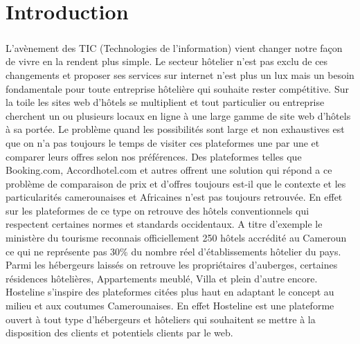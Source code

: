 \chapter*{Introduction}

\paragraph{}
L’avènement des TIC (Technologies de l’information) vient changer notre façon de vivre en la rendent plus simple. Le secteur hôtelier n’est pas exclu de ces changements et proposer ses services sur internet n’est plus un lux mais un besoin fondamentale pour toute entreprise hôtelière qui souhaite rester compétitive. Sur la toile les sites web d’hôtels se multiplient et tout particulier ou entreprise cherchent un ou plusieurs locaux en ligne à une large gamme de site web d’hôtels à sa portée. Le problème quand les possibilités sont large et non exhaustives est que on n’a pas toujours le temps de visiter ces plateformes une par une et comparer leurs offres selon nos préférences. Des plateformes telles que Booking.com, Accordhotel.com et autres offrent une solution qui répond a ce problème de comparaison de prix et d’offres toujours est-il que le contexte et les particularités camerounaises et Africaines n’est pas toujours retrouvée. En effet sur les plateformes de ce type on retrouve des hôtels conventionnels qui respectent certaines normes et standards occidentaux. A titre d’exemple le ministère du tourisme reconnais officiellement 250 hôtels accrédité au Cameroun ce qui ne représente pas 30\% du nombre réel d’établissements hôtelier du pays. Parmi les hébergeurs laissés on retrouve les propriétaires d’auberges, certaines résidences hôtelières, Appartements meublé, Villa et plein d’autre encore. Hosteline s’inspire des plateformes citées plus haut en adaptant le concept au milieu et aux coutumes Camerounaises. En effet Hosteline est une plateforme ouvert à tout type d’hébergeurs et hôteliers qui souhaitent se mettre à la disposition des clients et potentiels clients par le web.
